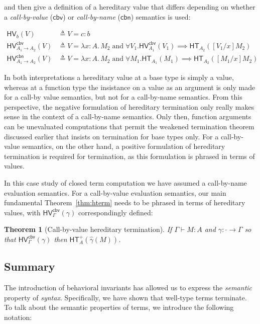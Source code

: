 \documentclass{article}
\newtheorem{thm}{Theorem}
\newcommand{\hasEF}[3]{\ensuremath{#1 \vdash #2 : #3}}
\newcommand{\hterm}[2]{\ensuremath{\mathsf{HT}_{#1}(#2)}}
\newcommand{\htermp}[2]{\ensuremath{\mathsf{HT}^+_{#1}(#2)}}
\newcommand{\hv}[2]{\ensuremath{\mathsf{HV}_{#1}(#2)}}
\newcommand{\hvcbn}[2]{\ensuremath{\mathsf{HV}^{\mathsf{cbn}}_{#1}(#2)}}
\newcommand{\hvcbv}[2]{\ensuremath{\mathsf{HV}^{\mathsf{cbv}}_{#1}(#2)}}
\newcommand{\fn}[2]{\ensuremath{#1 \to #2}}
\newcommand{\lam}[3]{\ensuremath{\lambda #1 {:} #2.\, #3}}
\begin{document}
\noindent and then give a definition of a hereditary value that differs depending on whether a \emph{call-by-value}
($\mathsf{cbv}$) or \emph{call-by-name} ($\mathsf{cbn}$) semantics is used:

\begin{align*}
\hv{b}{V} &\triangleq V = c : b \\
\hvcbv{\fn{A_1}{A_2}}{V} &\triangleq V = \lam{x}{A}{M_2} \; \text{and} \; \forall V_1. \hvcbv{A_1}{V_1} \implies
\hterm{A_2}{[V_1/x]M_2} \\
\hvcbn{\fn{A_1}{A_2}}{V} &\triangleq V = \lam{x}{A}{M_2} \; \text{and} \; \forall M_1. \hterm{A_1}{M_1} \implies
\hterm{A_2}{[M_1/x]M_2}
\end{align*}

In both interpretations a hereditary value at a base type is simply a value, whereas at a
function type the insistance on a value as an argument is only made for a call-by value
semantics, but not for a call-by-name semantics.  From this perspective, the negative
formulation of hereditary termination only really makes sense in the context of a call-by-name
semantics.  Only then, function arguments can be unevaluated computations that permit the weakened
termination theorem discussed earlier that insists on termination for base types only.  For a
call-by-value semantics, on the other hand, a positive formulation of hereditary termination is
required for termination, as this formulation is phrased in terms of values.

In this case study of closed term computation we have assumed a call-by-name evaluation
semantics.  For a call-by-value evaluation semantics, our main fundamental
Theorem~\ref{thm:hterm} needs to be phrased in terms of hereditary values, with
$\hvcbv{\Gamma}{\gamma}$ correspondingly defined:

\begin{thm}[Call-by-value hereditary termination]\label{thm:hcbvterm}
  If $\hasEF{\Gamma}{M}{A}$ and $\gamma : \cdot \to \Gamma$ so that
  $\hvcbv{\Gamma}{\gamma}$ then $\htermp{A}{\hat{\gamma}(M)}$.
\end{thm}

\subsection{Summary}

The introduction of behavioral invariants has allowed us to express the \emph{semantic}
property of \emph{syntax}.  Specifically, we have shown that well-type terms terminate.  To
talk about the semantic properties of terms, we introduce the following notation:
\end{document}
